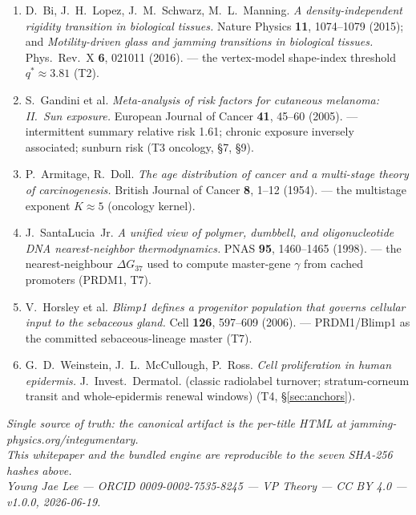 \documentclass[11pt,a4paper]{article}
\newcommand{\apx}{\ensuremath{\approx}}
\begin{document}
\begin{enumerate}[leftmargin=1.6em,itemsep=1.5pt]
\item D.~Bi, J.~H.~Lopez, J.~M.~Schwarz, M.~L.~Manning. \textit{A density-independent rigidity transition in
biological tissues.} Nature Physics \textbf{11}, 1074--1079 (2015); and \textit{Motility-driven glass and jamming
transitions in biological tissues.} Phys.\ Rev.\ X \textbf{6}, 021011 (2016). --- the vertex-model shape-index
threshold $q^{*}\apx3.81$ (T2).
\item S.~Gandini et al. \textit{Meta-analysis of risk factors for cutaneous melanoma: II.\ Sun exposure.}
European Journal of Cancer \textbf{41}, 45--60 (2005). --- intermittent summary relative risk 1.61; chronic
exposure inversely associated; sunburn risk (T3 oncology, \S7, \S9).
\item P.~Armitage, R.~Doll. \textit{The age distribution of cancer and a multi-stage theory of carcinogenesis.}
British Journal of Cancer \textbf{8}, 1--12 (1954). --- the multistage exponent $K\apx5$ (oncology kernel).
\item J.~SantaLucia~Jr. \textit{A unified view of polymer, dumbbell, and oligonucleotide DNA nearest-neighbor
thermodynamics.} PNAS \textbf{95}, 1460--1465 (1998). --- the nearest-neighbour $\Delta G_{37}$ used to compute
master-gene $\gamma$ from cached promoters (PRDM1, T7).
\item V.~Horsley et al. \textit{Blimp1 defines a progenitor population that governs cellular input to the sebaceous
gland.} Cell \textbf{126}, 597--609 (2006). --- PRDM1/Blimp1 as the committed sebaceous-lineage master (T7).
\item G.~D.~Weinstein, J.~L.~McCullough, P.~Ross. \textit{Cell proliferation in human epidermis.} J.\ Invest.\
Dermatol. (classic radiolabel turnover; stratum-corneum transit and whole-epidermis renewal windows) (T4,
\S\ref{sec:anchors}).
\end{enumerate}

\vfill
\begin{center}\footnotesize\itshape
Single source of truth: the canonical artifact is the per-title HTML at jamming-physics.org/integumentary.\\
This whitepaper and the bundled engine are reproducible to the seven SHA-256 hashes above.\\
Young Jae Lee --- ORCID 0009-0002-7535-8245 --- VP Theory --- CC BY 4.0 --- v1.0.0, 2026-06-19.
\end{center}
\end{document}
